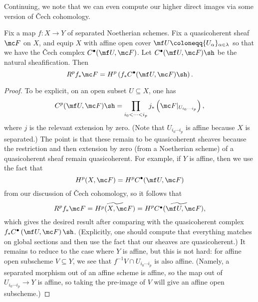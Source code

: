 \documentclass[../notes.tex]{subfiles}
\begin{document}
Continuing, we note that we can even compute our higher direct images via some version of \v Cech cohomology.
\begin{proposition}
	Fix a map $f\colon X\to Y$ of separated Noetherian schemes. Fix a quasicoherent sheaf $\mc F$ on $X$, and equip $X$ with affine open cover $\mf U\coloneqq\{U_\alpha\}_{\alpha\in\lambda}$ so that we have the \v{C}ech complex $C^\bullet(\mf U,\mc F)$. Let $C^\bullet(\mf U,\mc F)\sh$ be the natural sheafification. Then
	\[R^pf_*\mc F=H^p\left(f_*C^\bullet(\mf U,\mc F)\sh\right).\]
\end{proposition}
\begin{proof}
	To be explicit, on an open subset $U\subseteq X$, one has
	\[C^p(\mf U,\mc F)\sh=\prod_{i_0<\cdots<i_p}j_*\left(\mc F|_{U_{i_0\cdots i_p}}\right),\]
	where $j$ is the relevant extension by zero. (Note that $U_{i_0\cdots i_p}$ is affine because $X$ is separated.) The point is that these remain to be quasicoherent sheaves because the restriction and then extension by zero (from a Noetherian scheme) of a quasicoherent sheaf remain quasicoherent. For example, if $Y$ is affine, then we use the fact that
	\[H^p(X,\mc F)=H^pC^\bullet(\mf U,\mc F)\]
	from our discussion of \v Cech cohomology, so it follows that
	\[R^pf_*\mc F=\widetilde{H^p(X,\mc F)}=H^p\widetilde{C^\bullet(\mf U,\mc F)},\]
	which gives the desired result after comparing with the quasicoherent complex $f_*C^\bullet\left(\mf U,\mc F\right)\sh$. (Explicitly, one should compute that everything matches on global sections and then use the fact that our sheaves are quasicoherent.) It remains to reduce to the case where $Y$ is affine, but this is not hard: for affine open subscheme $V\subseteq Y$, we see that $f^{-1}V\cap U_{i_0\cdots i_p}$ is also affine. (Namely, a separated morphism out of an affine scheme is affine, so the map out of $U_{i_0\cdots i_p}\to Y$ is affine, so taking the pre-image of $V$ will give an affine open subscheme.)
\end{proof}
\end{document}
